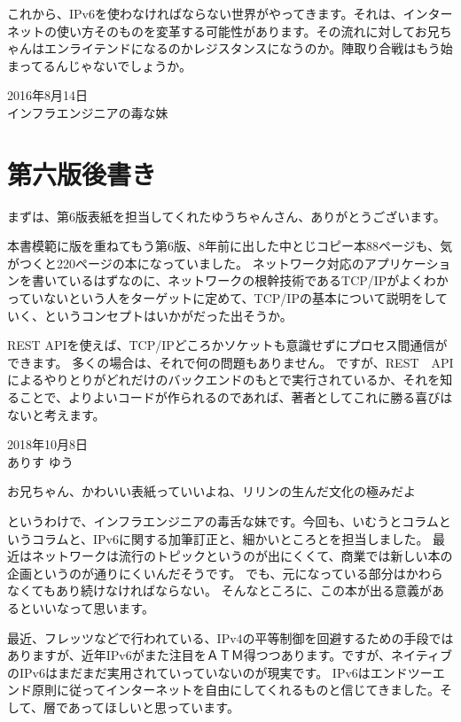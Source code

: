 これから、IPv6を使わなければならない世界がやってきます。それは、インターネットの使い方そのものを変革する可能性があります。その流れに対してお兄ちゃんはエンライテンドになるのかレジスタンスになうのか。陣取り合戦はもう始まってるんじゃないでしょうか。

\begin{flushright}
2016年8月14日 \\
インフラエンジニアの毒な妹 \\
\end{flushright}

\section*{第六版後書き}

まずは、第6版表紙を担当してくれたゆうちゃんさん、ありがとうございます。

本書模範に版を重ねてもう第6版、8年前に出した中とじコピー本88ページも、気がつくと220ページの本になっていました。
ネットワーク対応のアプリケーションを書いているはずなのに、ネットワークの根幹技術であるTCP/IPがよくわかっていないという人をターゲットに定めて、TCP/IPの基本について説明をしていく、というコンセプトはいかがだった出そうか。

REST APIを使えば、TCP/IPどころかソケットも意識せずにプロセス間通信ができます。
多くの場合は、それで何の問題もありません。
ですが、REST　APIによるやりとりがどれだけのバックエンドのもとで実行されているか、それを知ることで、よりよいコードが作られるのであれば、著者としてこれに勝る喜びはないと考えます。

\begin{flushright}
2018年10月8日 \\
ありす ゆう
\end{flushright}

お兄ちゃん、かわいい表紙っていいよね、リリンの生んだ文化の極みだよ

というわけで、インフラエンジニアの毒舌な妹です。今回も、いむうとコラムというコラムと、IPv6に関する加筆訂正と、細かいところとを担当しました。
最近はネットワークは流行のトピックというのが出にくくて、商業では新しい本の企画というのが通りにくいんだそうです。
でも、元になっている部分はかわらなくてもあり続けなければならない。
そんなところに、この本が出る意義があるといいなって思います。

最近、フレッツなどで行われている、IPv4の平等制御を回避するための手段ではありますが、近年IPv6がまた注目をＡＴＭ得つつあります。ですが、ネイティブのIPv6はまだまだ実用されていっていないのが現実です。
IPv6はエンドツーエンド原則に従ってインターネットを自由にしてくれるものと信じてきました。そして、層であってほしいと思っています。

